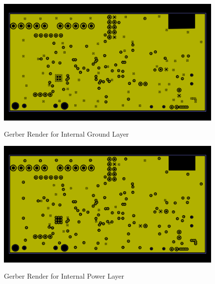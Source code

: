 \begin{figure}
\begin{center}
	\label{fig:GNDGerber}
	\includegraphics[angle=0,scale=1,width=.95\textwidth]{Images/Rev5_GNDGERB.png} 
	\caption{Gerber Render for Internal Ground Layer}
\end{center}
\end{figure}


\begin{figure}
\begin{center}
	\label{fig:PWRGerber}
	\includegraphics[angle=0,scale=1,width=.95\textwidth]{Images/Rev5_PWRGERB.png} 
	\caption{Gerber Render for Internal Power Layer}
\end{center}
\end{figure}


\newcommand{\putOversized}[7]{
\ifnum1=#6\relax
	\raggedright\noindent\bfseries\Large Appendix \ref{#1} (cont.) \par
\fi
	\raggedright\fbox{\texttt{[image: \#2]}}
	
\ifnum1=#4\relax
	\normalfont\normalsize \parbox{#7}{\raggedleft(cont. on next page)} \par
\fi
\raggedright\clearpage
}


